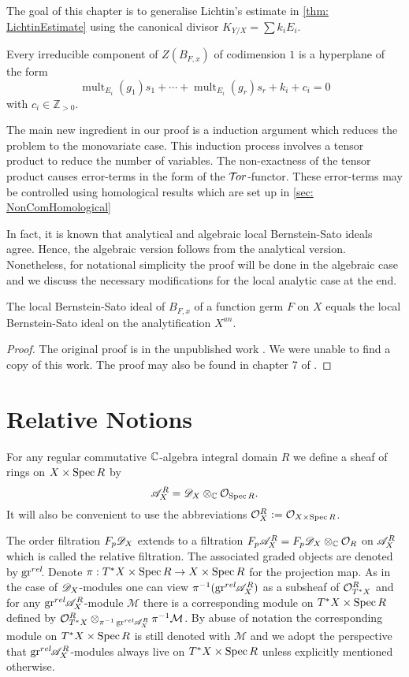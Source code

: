 The goal of this chapter is to generalise Lichtin's estimate in \cref{thm: LichtinEstimate} using the canonical divisor $K_{Y/X} = \sum k_i E_i$.
\begin{theorem}\label{thm: EstimateBernsteinSatoZeroLocust}
  Every irreducible component of $Z(B_{F,x})$ of codimension $1$ is a hyperplane of the form
  $$\operatorname{mult}_{E_i}(g_1) s_1 + \cdots + \operatorname{mult}_{E_i}(g_r)s_r + k_i + c_i=0$$
  with $c_i \in \mathbb{Z}_{> 0 }$.
\end{theorem}
The main new ingredient in our proof is a induction argument which reduces the problem to the monovariate case.
This induction process involves a tensor product to reduce the number of variables.
The non-exactness of the tensor product causes error-terms in the form of the $\mathcal{T}\mkern -3mu or$-functor.
These error-terms may be controlled using homological results which are set up in \cref{sec: NonComHomological}

In fact, it is known that analytical and algebraic local Bernstein-Sato ideals agree.
Hence, the algebraic version follows from the analytical version.
Nonetheless, for notational simplicity the proof will be done in the algebraic case and we discuss the necessary modifications for the local analytic case at the end.
\begin{theorem}\label{thm: AnalyticAlgebraic}
  The local Bernstein-Sato ideal of $B_{F,x}$ of a function germ $F$ on $X$ equals the local Bernstein-Sato ideal on the analytification $X^{an}$.
\end{theorem}
\begin{proof}
  The original proof is in the unpublished work \cite{brianccon2002remarques}.
  We were unable to find a copy of this work.
  The proof may also be found in chapter 7 of \cite{MasterThesisBSLocal}.
\end{proof}
\section{Relative Notions}
For any regular commutative $\mathbb{C}$-algebra integral domain $R$ we define a sheaf of rings on $X\times \operatorname{Spec} R$ by
$$\mathscr{A}_{X}^R = \mathscr{D}_X \otimes_{\mathbb{C}} \mathcal{O}_{\operatorname{Spec} R}.$$
It will also be convenient to use the abbreviations $\mathcal{O}_{X}^R := \mathcal{O}_{X \times \operatorname{Spec} R}$.

The order filtration $F_p\mathscr{D}_X$ extends to a filtration $F_p\mathscr{A}^R_X = F_p\mathscr{D}_X \otimes_{\mathbb{C}} \mathcal{O}_R$ on $\mathscr{A}^R_X$ which is called the relative filtration.
The associated graded objects are denoted by $\operatorname{gr}^{rel}\mkern-5mu$. Denote $\pi:T^*X\times \operatorname{Spec} R \to X\times \operatorname{Spec} R$ for the projection map.
As in the case of $\mathscr{D}_X$-modules one can view $\pi^{-1}(\operatorname{gr}^{rel}\mkern-5mu\mathscr{A}_X^R)$ as a subsheaf of $\mathcal{O}_{T^*X}^R$ and for any $\operatorname{gr}^{rel}\mkern-5mu\mathscr{A}_X^R$-module $\mathcal{M}$ there is a corresponding module on $T^*X\times \operatorname{Spec} R$ defined by $\mathcal{O}_{T^*X}^R\otimes_{\pi^{-1}\operatorname{gr}^{rel}\mkern-5mu\mathscr{A}_X^R}\pi^{-1}\mathcal{M}$.
By abuse of notation the corresponding module on $T^*X\times \operatorname{Spec} R$ is still denoted with $\mathcal{M}$ and we adopt the perspective that $\operatorname{gr}^{rel}\mkern-5mu\mathscr{A}_X^R$-modules always live on $T^*X\times \operatorname{Spec} R$ unless explicitly mentioned otherwise.

